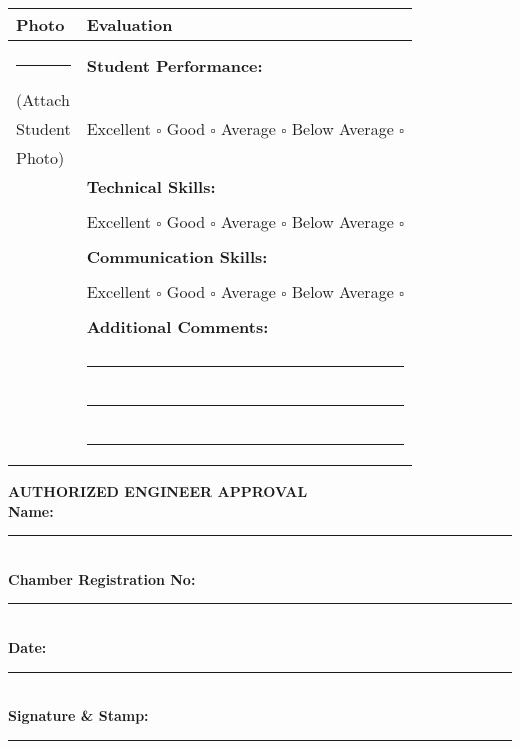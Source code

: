 \documentclass[12pt,a4paper,oneside]{book}
\begin{document}
\begin{center}
\begin{tabular}{|p{2cm}|p{10cm}|}
\hline
\rowcolor{lightgray}
\textbf{Photo} & \textbf{Evaluation} \\
\hline
& \\
\rule{2cm}{3cm} & \textbf{Student Performance:} \\
(Attach & \\
Student & Excellent \(\square\) Good \(\square\) Average \(\square\) Below Average \(\square\) \\
Photo) & \\
& \textbf{Technical Skills:} \\
& \\
& Excellent \(\square\) Good \(\square\) Average \(\square\) Below Average \(\square\) \\
& \\
& \textbf{Communication Skills:} \\
& \\
& Excellent \(\square\) Good \(\square\) Average \(\square\) Below Average \(\square\) \\
& \\
& \textbf{Additional Comments:} \\
& \\
& \rule{9cm}{0.4pt} \\[0.2cm]
& \rule{9cm}{0.4pt} \\[0.2cm]
& \rule{9cm}{0.4pt} \\[0.2cm]
\hline
\end{tabular}
\end{center}

\vspace{1cm}

\begin{center}
\textbf{AUTHORIZED ENGINEER APPROVAL} \\[0.5cm]
\textbf{Name:} \rule{6cm}{0.4pt} \\[0.5cm]
\textbf{Chamber Registration No:} \rule{4cm}{0.4pt} \\[0.5cm]
\textbf{Date:} \rule{3cm}{0.4pt} \\[1cm]
\textbf{Signature \& Stamp:} \\[1cm]
\rule{8cm}{0.4pt}
\end{center}
\end{document}
